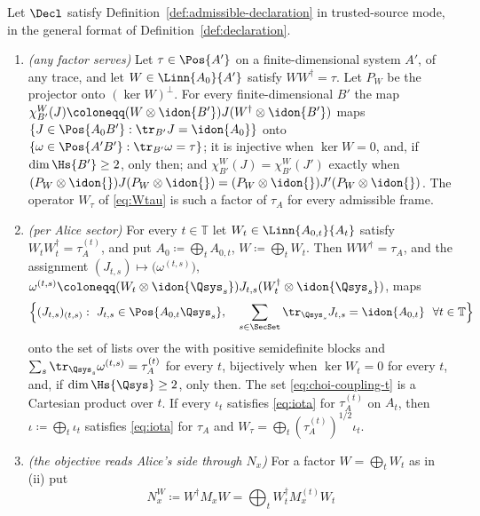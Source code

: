 \begin{lemma}\label{lem:choi-factor}
Let $\Decl$ satisfy Definition~\ref{def:admissible-declaration} in trusted-source mode, in the
general format of Definition~\ref{def:declaration}.
\begin{enumerate}[label=(\roman*),leftmargin=2.2em]
\item \emph{(any factor serves)} Let $\tau\in\Pos{A'}$ on a
finite-dimensional system $A'$, of any trace, and let $W\in\Linn{A_0}{A'}$
satisfy $WW^{\dagger}=\tau$. Let $P_W$ be the projector onto
$(\ker W)^{\perp}$. For every finite-dimensional $B'$ the map
$\chi^{W}_{B'}(J)\coloneqq(W\otimes\idon{B'})J(W^{\dagger}\otimes\idon{B'})$
maps $\{J\in\Pos{A_0B'}:\tr_{B'}J=\idon{A_0}\}$ onto
$\{\omega\in\Pos{A'B'}:\tr_{B'}\omega=\tau\}$; it is injective when
$\ker W=0$, and, if $\dim\Hs{B'}\ge2$, only then; and
$\chi^{W}_{B'}(J)=\chi^{W}_{B'}(J')$ exactly when
$(P_W\otimes\idon{})J(P_W\otimes\idon{})=(P_W\otimes\idon{})J'(P_W\otimes\idon{})$.
The operator $W_{\tau}$ of \eqref{eq:Wtau} is such a factor of $\tau_A$ for
every admissible frame.
\item \emph{(per Alice sector)} For every $t\in\mathbb{T}$ let $W_t\in
\Linn{A_{0,t}}{A_t}$ satisfy $W_tW_t^{\dagger}=\tau^{(t)}_A$, and put
$A_0\coloneqq\bigoplus_tA_{0,t}$, $W\coloneqq\bigoplus_tW_t$. Then
$WW^{\dagger}=\tau_A$, and the assignment
$(J_{t,s})\mapsto\big(\omega^{(t,s)}\big)$,
$\omega^{(t,s)}\coloneqq(W_t\otimes\idon{\Qsys_s})J_{t,s}
(W_t^{\dagger}\otimes\idon{\Qsys_s})$, maps
\begin{equation}\label{eq:choi-coupling-t}
  \Big\{(J_{t,s})_{(t,s)}:\ J_{t,s}\in\Pos{A_{0,t}\Qsys_s},\quad
  \sum_{s\in\SecSet}\tr_{\Qsys_s}J_{t,s}=\idon{A_{0,t}}
  \ \ \forall t\in\mathbb{T}\Big\}
\end{equation}
onto the set of lists over the  with positive semidefinite
blocks and $\sum_s\tr_{\Qsys_s}\omega^{(t,s)}=\tau^{(t)}_A$ for every $t$,
bijectively when $\ker W_t=0$ for every $t$, and, if
$\dim\Hs{\Qsys}\ge2$, only then. The set
\eqref{eq:choi-coupling-t} is a Cartesian product over $t$. If every
$\iota_t$ satisfies \eqref{eq:iota} for $\tau^{(t)}_A$ on $A_t$, then
$\iota\coloneqq\bigoplus_t\iota_t$ satisfies \eqref{eq:iota} for $\tau_A$ and
$W_{\tau}=\bigoplus_t(\tau^{(t)}_A)^{1/2}\iota_t$.
\item \emph{(the objective reads Alice's side through $N_x$)} For a factor
$W=\bigoplus_tW_t$ as in (ii) put
\begin{equation}\label{eq:NfromW}
  N^{W}_x\coloneqq W^{\dagger}M_xW=\bigoplus_tW_t^{\dagger}M^{(t)}_xW_t

\end{equation}
\end{enumerate}
\end{lemma}
